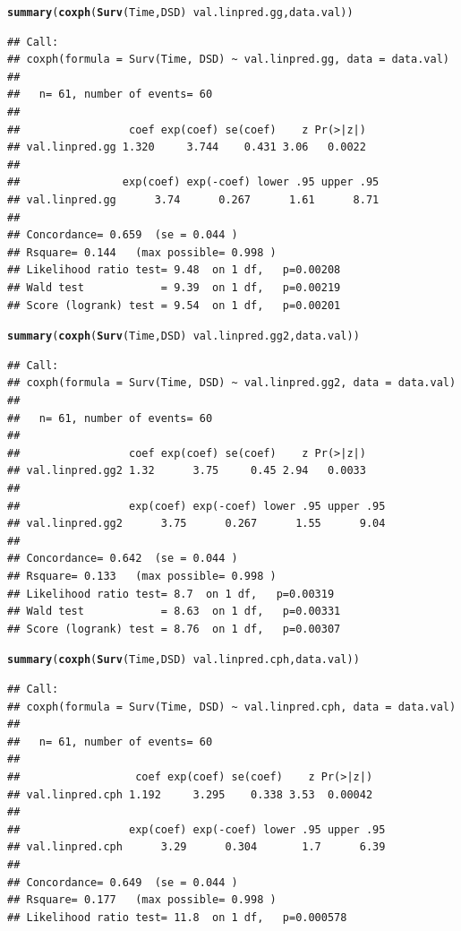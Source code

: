 \documentclass{article}\usepackage[]{graphicx}\usepackage[]{color}
\makeatletter
\newcommand{\hlopt}[1]{\textcolor[rgb]{0,0,0}{#1}}%
\newcommand{\hlstd}[1]{\textcolor[rgb]{0.345,0.345,0.345}{#1}}%
\newcommand{\hlkwd}[1]{\textcolor[rgb]{0.737,0.353,0.396}{\textbf{#1}}}%
\newenvironment{kframe}{%
 \def\at@end@of@kframe{}%
 \ifinner\ifhmode%
  \def\at@end@of@kframe{\end{minipage}}%
  \begin{minipage}{\columnwidth}%
 \fi\fi%
 \def\FrameCommand##1{\hskip\@totalleftmargin \hskip-\fboxsep
 \colorbox{shadecolor}{##1}\hskip-\fboxsep
     \hskip-\linewidth \hskip-\@totalleftmargin \hskip\columnwidth}%
 \MakeFramed {\advance\hsize-\width
   \@totalleftmargin\z@ \linewidth\hsize
   \@setminipage}}%
 {\par\unskip\endMakeFramed%
 \at@end@of@kframe}
\newenvironment{knitrout}{}{} %
\makeatother
\begin{document}
\begin{knitrout}
\begin{kframe}
\begin{alltt}
\hlkwd{summary}\hlstd{(}\hlkwd{coxph}\hlstd{(}\hlkwd{Surv}\hlstd{(Time, DSD)} \hlopt{~} \hlstd{val.linpred.gg, data.val))}
\end{alltt}
\begin{verbatim}
## Call:
## coxph(formula = Surv(Time, DSD) ~ val.linpred.gg, data = data.val)
## 
##   n= 61, number of events= 60 
## 
##                 coef exp(coef) se(coef)    z Pr(>|z|)
## val.linpred.gg 1.320     3.744    0.431 3.06   0.0022
## 
##                exp(coef) exp(-coef) lower .95 upper .95
## val.linpred.gg      3.74      0.267      1.61      8.71
## 
## Concordance= 0.659  (se = 0.044 )
## Rsquare= 0.144   (max possible= 0.998 )
## Likelihood ratio test= 9.48  on 1 df,   p=0.00208
## Wald test            = 9.39  on 1 df,   p=0.00219
## Score (logrank) test = 9.54  on 1 df,   p=0.00201
\end{verbatim}
\begin{alltt}
\hlkwd{summary}\hlstd{(}\hlkwd{coxph}\hlstd{(}\hlkwd{Surv}\hlstd{(Time, DSD)} \hlopt{~} \hlstd{val.linpred.gg2, data.val))}
\end{alltt}
\begin{verbatim}
## Call:
## coxph(formula = Surv(Time, DSD) ~ val.linpred.gg2, data = data.val)
## 
##   n= 61, number of events= 60 
## 
##                 coef exp(coef) se(coef)    z Pr(>|z|)
## val.linpred.gg2 1.32      3.75     0.45 2.94   0.0033
## 
##                 exp(coef) exp(-coef) lower .95 upper .95
## val.linpred.gg2      3.75      0.267      1.55      9.04
## 
## Concordance= 0.642  (se = 0.044 )
## Rsquare= 0.133   (max possible= 0.998 )
## Likelihood ratio test= 8.7  on 1 df,   p=0.00319
## Wald test            = 8.63  on 1 df,   p=0.00331
## Score (logrank) test = 8.76  on 1 df,   p=0.00307
\end{verbatim}
\begin{alltt}
\hlkwd{summary}\hlstd{(}\hlkwd{coxph}\hlstd{(}\hlkwd{Surv}\hlstd{(Time, DSD)} \hlopt{~} \hlstd{val.linpred.cph, data.val))}
\end{alltt}
\begin{verbatim}
## Call:
## coxph(formula = Surv(Time, DSD) ~ val.linpred.cph, data = data.val)
## 
##   n= 61, number of events= 60 
## 
##                  coef exp(coef) se(coef)    z Pr(>|z|)
## val.linpred.cph 1.192     3.295    0.338 3.53  0.00042
## 
##                 exp(coef) exp(-coef) lower .95 upper .95
## val.linpred.cph      3.29      0.304       1.7      6.39
## 
## Concordance= 0.649  (se = 0.044 )
## Rsquare= 0.177   (max possible= 0.998 )
## Likelihood ratio test= 11.8  on 1 df,   p=0.000578

\end{verbatim}
\end{kframe}
\end{knitrout}
\end{document}
